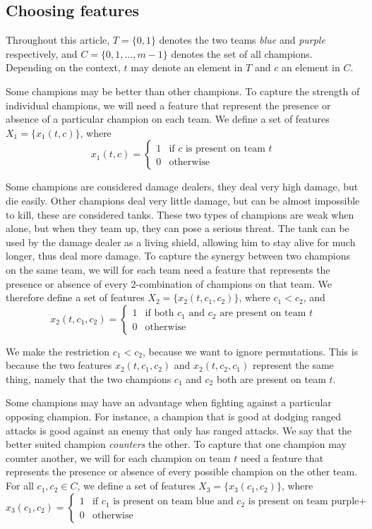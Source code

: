 \subsection{Choosing features}\label{sec:choosingfeatures}
Throughout this article, $T = \{0, 1\}$ denotes the two teams \emph{blue} and \emph{purple} respectively, and $C = \{0, 1, \dots, m-1\}$ denotes the set of all champions. Depending on the context, $t$ may denote an element in $T$ and $c$ an element in $C$.

Some champions may be better than other champions. To capture the strength of individual champions, we will need a feature that represent the presence or absence of a particular champion on each team.
We define a set of features $X_1 = \{x_1(t, c)\}$, where
\[
x_1(t, c) = 
\begin{cases} 
  1 & \text{if } c \text{ is present on team } t \\
  0 & \text{otherwise} 
\end{cases}
\]

Some champions are considered damage dealers, they deal very high damage, but die easily. Other champions deal very little damage, but can be almost impossible to kill, these are considered tanks. These two types of champions are weak when alone, but when they team up, they can pose a serious threat. The tank can be used by the damage dealer as a living shield, allowing him to stay alive for much longer, thus deal more damage.
To capture the synergy between two champions on the same team, we will for each team need a feature that represents the presence or absence of every 2-combination %
of champions on that team. We therefore define a set of features $X_2 = \{x_2(t, c_1, c_2)\}$, where $c_1 < c_2$, and
\[
x_2(t, c_1, c_2) = 
\begin{cases} 
1 & \text{if both } c_1 \text{ and } c_2 \text{ are present on team } t \\
0 & \text{otherwise} 
\end{cases}
\]

We make the restriction $c_1 < c_2$, because we want to ignore permutations. This is because the two features $x_2(t, c_1, c_2)$ and $x_2(t, c_2, c_1)$ represent the same thing, namely that the two champions $c_1$ and $c_2$ both are present on team $t$.

Some champions may have an advantage when fighting against a particular opposing champion.
For instance, a champion that is good at dodging ranged attacks is good against an enemy that only has ranged attacks.
We say that the better suited champion \emph{counters} the other.
To capture that one champion may counter another, we will for each champion on team $t$ need a feature that represents the presence or absence of every possible champion on the other team.
For all $c_1, c_2 \in C$, we define a set of features $X_3= \{x_3(c_1, c_2) \}$, where
\[x_3(c_1, c_2) = 
\begin{cases} 
1 & \text{if } c_1 \text{ is present on team blue and } c_2 \text{ is present on team purple+ } \\ 
0 & \text{otherwise} 
\end{cases}\]


